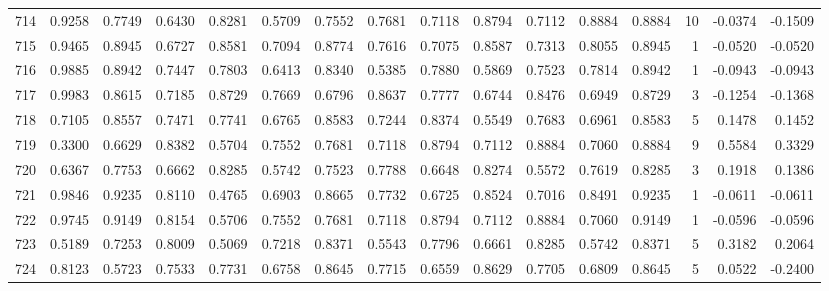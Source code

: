 \begin{tabular}{lrrrrrrrrrrrrrrr}
714 &      0.9258 &  0.7749 &  0.6430 &  0.8281 &  0.5709 &  0.7552 &  0.7681 &  0.7118 &  0.8794 &  0.7112 &   0.8884 &     0.8884 &     10 &                   -0.0374 &                    -0.1509 \\
715 &      0.9465 &  0.8945 &  0.6727 &  0.8581 &  0.7094 &  0.8774 &  0.7616 &  0.7075 &  0.8587 &  0.7313 &   0.8055 &     0.8945 &      1 &                   -0.0520 &                    -0.0520 \\
716 &      0.9885 &  0.8942 &  0.7447 &  0.7803 &  0.6413 &  0.8340 &  0.5385 &  0.7880 &  0.5869 &  0.7523 &   0.7814 &     0.8942 &      1 &                   -0.0943 &                    -0.0943 \\
717 &      0.9983 &  0.8615 &  0.7185 &  0.8729 &  0.7669 &  0.6796 &  0.8637 &  0.7777 &  0.6744 &  0.8476 &   0.6949 &     0.8729 &      3 &                   -0.1254 &                    -0.1368 \\
718 &      0.7105 &  0.8557 &  0.7471 &  0.7741 &  0.6765 &  0.8583 &  0.7244 &  0.8374 &  0.5549 &  0.7683 &   0.6961 &     0.8583 &      5 &                    0.1478 &                     0.1452 \\
719 &      0.3300 &  0.6629 &  0.8382 &  0.5704 &  0.7552 &  0.7681 &  0.7118 &  0.8794 &  0.7112 &  0.8884 &   0.7060 &     0.8884 &      9 &                    0.5584 &                     0.3329 \\
720 &      0.6367 &  0.7753 &  0.6662 &  0.8285 &  0.5742 &  0.7523 &  0.7788 &  0.6648 &  0.8274 &  0.5572 &   0.7619 &     0.8285 &      3 &                    0.1918 &                     0.1386 \\
721 &      0.9846 &  0.9235 &  0.8110 &  0.4765 &  0.6903 &  0.8665 &  0.7732 &  0.6725 &  0.8524 &  0.7016 &   0.8491 &     0.9235 &      1 &                   -0.0611 &                    -0.0611 \\
722 &      0.9745 &  0.9149 &  0.8154 &  0.5706 &  0.7552 &  0.7681 &  0.7118 &  0.8794 &  0.7112 &  0.8884 &   0.7060 &     0.9149 &      1 &                   -0.0596 &                    -0.0596 \\
723 &      0.5189 &  0.7253 &  0.8009 &  0.5069 &  0.7218 &  0.8371 &  0.5543 &  0.7796 &  0.6661 &  0.8285 &   0.5742 &     0.8371 &      5 &                    0.3182 &                     0.2064 \\
724 &      0.8123 &  0.5723 &  0.7533 &  0.7731 &  0.6758 &  0.8645 &  0.7715 &  0.6559 &  0.8629 &  0.7705 &   0.6809 &     0.8645 &      5 &                    0.0522 &                    -0.2400 \\

\end{tabular}
